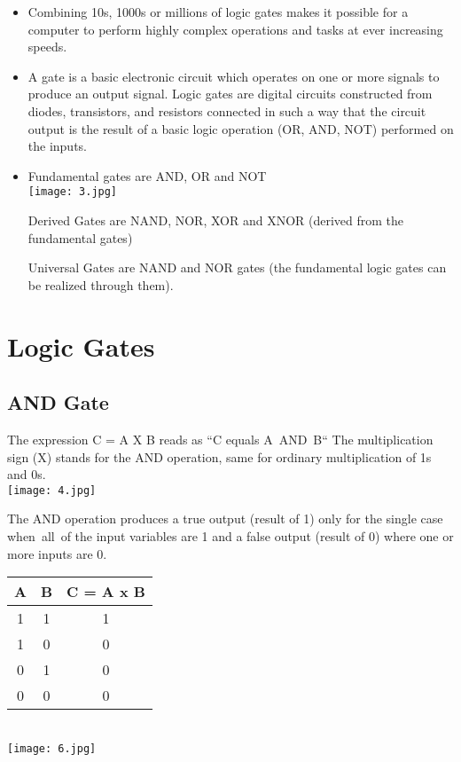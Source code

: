 \documentclass[10pt,a4paper,onecolumn]{article}
\begin{document}
\begin{itemize}
		\item Combining 10s, 1000s or millions of logic gates makes it possible for a computer to perform highly complex operations and tasks at ever increasing speeds. \\
		
		\item A gate is a basic electronic circuit which operates on one or more signals to produce an output signal. 
		Logic gates are digital circuits constructed from diodes, transistors, and resistors connected in such a way that the circuit output is the result of a basic logic operation (OR, AND, NOT) performed on the inputs. \\
		
		\item Fundamental gates are \color{red}AND, OR \color{black}and \color{red}NOT \\
		\texttt{[image: 3.jpg]}
		
		\color{black}Derived Gates are \color{red}NAND, NOR, XOR \color{black}and \color{red}XNOR \color{black}(derived from the fundamental gates)
		
		Universal Gates are \color{red}NAND \color{black} and \color{red}NOR \color{black}gates (the fundamental logic gates can be realized through them).
		
		
	\end{itemize}
\section{Logic Gates}

\subsection{AND Gate}
The expression C = A X B reads as “C equals A AND B“ 
The multiplication sign (X) stands for the AND operation, same for ordinary multiplication of 1s and 0s.\\
\texttt{[image: 4.jpg]}

The AND operation produces a true output (result of 1) only for the single case when all of the input variables are 1 and a false output (result of 0) where one or more inputs are 0. \\
\begin{table}[h!]
	\begin{center}
		\begin{tabular}{c|c|c}
			\textbf{A} & \textbf{B} &
			\textbf{C = A x B}\\
			\hline
			1 & 1 & 1\\
			\hline
			1 & 0 & 0\\
			\hline
			0 & 1 & 0\\
			\hline
			0 & 0 & 0\\
			\hline
		\end{tabular}
	\end{center}
\end{table} \\
\texttt{[image: 6.jpg]}
\end{document}
